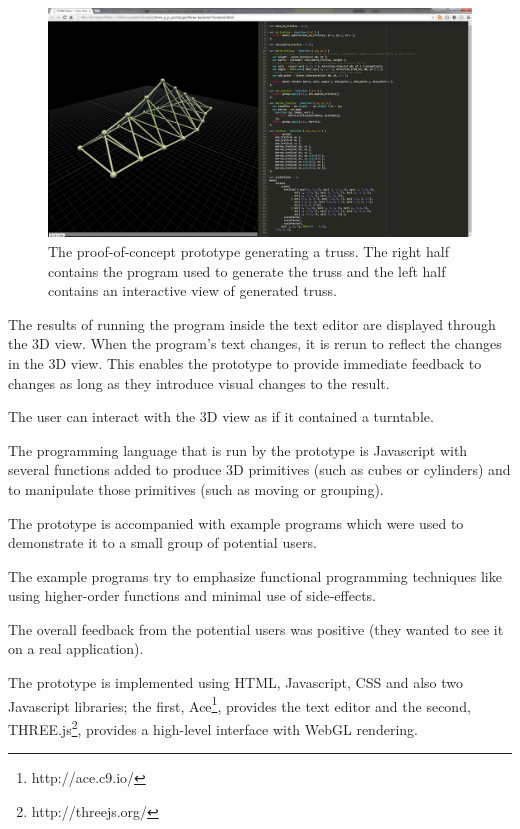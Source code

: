\documentclass{./llncs2e/llncs}
\begin{document}
	\begin{figure}
	  \centering
	  \includegraphics[width=1.0\textwidth]{img/proto_3d_p_editor}
	    \caption{The proof-of-concept prototype generating a truss. The right half contains the program used to generate the truss and the left half contains an interactive view of generated truss.}
	  \label{fig:proto:3d:p:editor}
	\end{figure} 

	The results of running the program inside the text editor are displayed through the 3D view. 
	When the program's text changes, it is rerun to reflect the changes in the 3D view. 
	This enables the prototype to provide immediate feedback to changes as long as they introduce visual changes to the result.

	The user can interact with the 3D view as if it contained a turntable.

	The programming language that is run by the prototype is Javascript with several functions added to produce 3D primitives (such as cubes or cylinders) and to manipulate those primitives (such as moving or grouping).

	The prototype is accompanied with example programs which were used to demonstrate it to a small group of potential users.

	The example programs try to emphasize functional programming techniques like using higher-order functions and minimal use of side-effects.

	The overall feedback from the potential users was positive (they wanted to see it on a real application).

	The prototype is implemented using HTML, Javascript, CSS and also two Javascript libraries; the first, Ace\footnote{http://ace.c9.io/}, provides the text editor and the second, THREE.js\footnote{http://threejs.org/}, provides a high-level interface with WebGL rendering.
\end{document}

